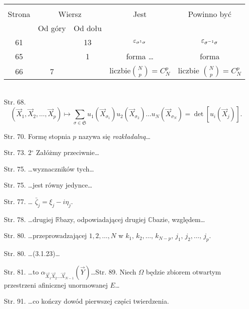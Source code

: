\documentclass[a4paper,11pt]{article}
\begin{document}
\begin{center}
  \begin{tabular}{|c|c|c|c|c|}
    \hline
    & \multicolumn{2}{c|}{} & & \\
    Strona & \multicolumn{2}{c|}{Wiersz} & Jest
                              & Powinno być \\ \cline{2-3}
    & Od góry & Od dołu & & \\
    \hline
    61  & & 13 & $\varepsilon_{ \sigma^{ 1 } \sigma }$
           & $\varepsilon_{ \sigma^{ -1 } \sigma }$ \\
    65  & &  1 & forma \ldots & forma \\
    66  &  7 & & liczbie${ N \choose p } =  C^{ p }_{ N } $
           & liczbie ${ N \choose p } =  C^{ p }_{ N } $ \\
    \hline
  \end{tabular}
\end{center}
\noi \\
\start Str. 68.
$$( \vec{ X }_{ 1 }, \vec{ X }_{ 2 }, \ldots, \vec{ X }_{ p })
\mapsto \sum_{\sigma \in \mathfrak{ S } } u_{ 1 }( \vec{ X }_{
  \sigma_{ 1 } } ) u_{ 2 }( \vec{ X }_{ \sigma_{ 2 } } ) \ldots u_{ N
}( \vec{ X }_{ \sigma_{ N } } ) = \det[ u_{ i }( \vec{ X }_{ j } ) ]
\textrm{.}$$

\start Str. 70. Formę stopnia $p$ nazywa się \emph{rozkładalną}\ldots

\start Str. 73. 2$^{\circ}$ Załóżmy przeciwnie\ldots

\start Str. 75. \ldots wyznaczników tych\ldots

\start Str. 75. \ldots jest równy jedynce\ldots

\start Str. 77. \ldots
$\bar{ \zeta }_{ j } = \xi_{ j } - i \eta_{ j }$.

\start Str. 78. \ldots drugiej $\mathbb{R}$\dywiz bazy, odpowiadającej
drugiej $\mathbb{C}$\dywiz bazie, względem\ldots

\start Str. 80. \ldots przeprowadzającej $1, 2, \ldots, N$ w
$k_{ 1 }, \, k_{ 2 }, \ldots, \, k_{ N - p }, \, j_{ 1 }, \, j_{ 2 },
\ldots, \, j_{ p }$.

\start Str. 80. \ldots (3.1.23)\ldots

\start Str. 81. \ldots to
$\alpha_{ \vec{ X }_{ 1 } \vec{ X }_{ 2 } \ldots \vec{ X }_{ N - 1 } }
( \vec{ Y } )$\ldots \start Str. 89. Niech $\Omega$ będzie zbiorem
otwartym przestrzeni af\mbox{}inicznej unormowanej $E$\ldots

\start Str. 91. \ldots co kończy dowód pierwszej części twierdzenia.
\end{document}
